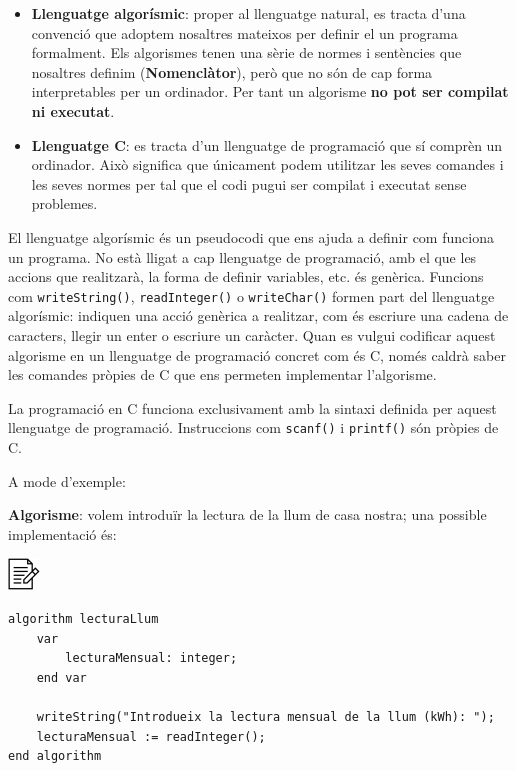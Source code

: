 \documentclass[]{book}
\providecommand{\tightlist}{%
  \setlength{\itemsep}{0pt}\setlength{\parskip}{0pt}}
\begin{document}
\begin{itemize}
\tightlist
\item
  \textbf{Llenguatge algorísmic}: proper al llenguatge natural, es tracta d'una convenció que adoptem nosaltres mateixos per definir el un programa formalment. Els algorismes tenen una sèrie de normes i sentències que nosaltres definim (\textbf{Nomenclàtor}), però que no són de cap forma interpretables per un ordinador. Per tant un algorisme \textbf{no pot ser compilat ni executat}.
\item
  \textbf{Llenguatge C}: es tracta d'un llenguatge de programació que sí comprèn un ordinador. Això significa que únicament podem utilitzar les seves comandes i les seves normes per tal que el codi pugui ser compilat i executat sense problemes.
\end{itemize}

El llenguatge algorísmic és un pseudocodi que ens ajuda a definir com funciona un programa. No està lligat a cap llenguatge de programació, amb el que les accions que realitzarà, la forma de definir variables, etc. és genèrica. Funcions com \texttt{writeString()}, \texttt{readInteger()} o \texttt{writeChar()} formen part del llenguatge algorísmic: indiquen una acció genèrica a realitzar, com és escriure una cadena de caracters, llegir un enter o escriure un caràcter. Quan es vulgui codificar aquest algorisme en un llenguatge de programació concret com és C, només caldrà saber les comandes pròpies de C que ens permeten implementar l'algorisme.

La programació en C funciona exclusivament amb la sintaxi definida per aquest llenguatge de programació. Instruccions com \texttt{scanf()} i \texttt{printf()} són pròpies de C.

A mode d'exemple:

\textbf{Algorisme}: volem introduïr la lectura de la llum de casa nostra; una possible implementació és:

\includegraphics{./img/alg.png}

\begin{verbatim}
algorithm lecturaLlum
    var
        lecturaMensual: integer;
    end var

    writeString("Introdueix la lectura mensual de la llum (kWh): ");
    lecturaMensual := readInteger();
end algorithm
\end{verbatim}
\end{document}

